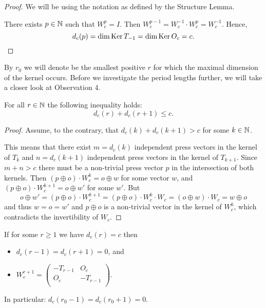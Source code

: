 \begin{proof}
  We will be using the notation as defined by the Structure Lemma.

  There exists $p\in\mathbb{N}$ such that $W_{c}^{p} = I$.
  Then $W_{c}^{p-1} = W_{c}^{-1} \cdot W_{c}^{p} = W_{c}^{-1}$.
  Hence,
  \[
  d_{c}(p)
  =
  \dim\operatorname{Ker} T_{-1}
  =
  \dim\operatorname{Ker} O_c
  = c.
  \]
\end{proof}
By $r_0$ we will denote be the smallest positive $r$ for which the maximal
dimension of the kernel occurs.
Before we investigate the period lengths further,
we will take a closer look at Observation 4.

\begin{theorem}[Observation 4]\label{thm:consec}
  For all $r\in\mathbb{N}$ the following inequality holds:
  \[d_{c}(r) + d_{c}(r+1) \leq c.\]
\end{theorem}
\begin{proof}
  Assume, to the contrary, that $d_{c}(k) + d_{c}(k+1) > c$ for some $k\in\mathbb{N}$.

  This means that there exist $m=d_{c}(k)$ independent press vectors
  in the kernel of $T_k$ and
  $n = d_{c}(k+1)$ independent press vectors
  in the kernel of $T_{k+1}$.
  Since $m+n>c$ there must be a non-trivial press vector $p$ in the intersection
  of both kernels. Then $(p\oplus o)\cdot W_c^{k} = o\oplus w$ for
  some vector $w$, and $(p\oplus o)\cdot W_c^{k+1}=o\oplus w'$ for some $w'$.
  But 
  \[ o\oplus w'=(p\oplus o)\cdot W_c^{k+1}=(p\oplus o)\cdot W_c^{k}\cdot W_c=(o\oplus w)\cdot W_c=
   w\oplus o\]
  and thus $w=o=w'$ and $p\oplus o$ is a non-trivial vector in the kernel
  of $W_c^k$, which contradicts the invertibility of $W_c$.
\end{proof}

\begin{corollary}\label{cor:max}
  If for some $r\geq 1$ we have $d_{c}(r) = c$ then
  \begin{itemize}
    \item $d_{c}(r-1) = d_{c}(r+1) = 0$, and
    \item $W_{c}^{r+1} = \left(\begin{matrix} -T_{r-1} & O_c \\
                                  O_c & -T_{r-1} \\\end{matrix}\right)$.
  \end{itemize}
	In particular: $d_c(r_0-1)=d_c(r_0+1)=0$.
\end{corollary}

